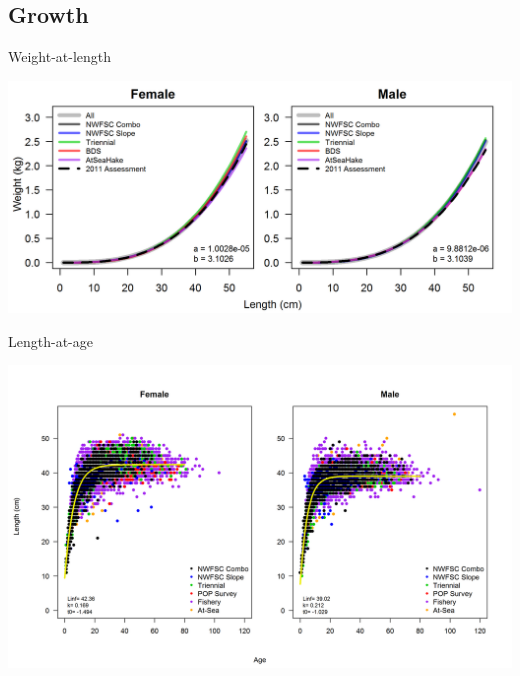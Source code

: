 \documentclass[pdf]{beamer}\usepackage[]{graphicx}\usepackage[]{color}
\begin{document}
\subsection{Growth}
\begin{frame}{Weight-at-length}
  \begin{center}
    \includegraphics[scale = 0.75]{figures/weightAtLengthPred.png}
  \end{center}
\end{frame}

\begin{frame}{Length-at-age}
  \begin{center}
  \includegraphics[scale = 0.45]{figures/LengthAgeAll_2.png}
  \end{center}
\end{frame}
\end{document}
